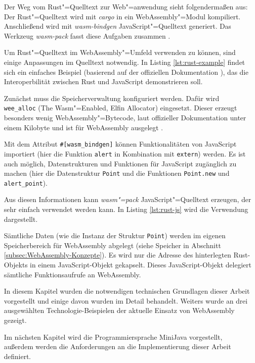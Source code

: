 Der Weg vom Rust"=Quelltext zur Web"=anwendung sieht folgendermaßen aus: Der Rust"=Quelltext wird mit \emph{cargo} in ein WebAssembly"=Modul kompiliert. Anschließend wird mit \emph{wasm-bindgen} JavaScript"=Quelltext generiert. Das Werkzeug \emph{wasm-pack} fasst diese Aufgaben zusammen \cite{RustWasmBook}.

Um Rust"=Quelltext im WebAssembly"=Umfeld verwenden zu können, sind einige Anpassungen im Quelltext notwendig. In Listing \ref{lst:rust-example} findet sich ein einfaches Beispiel (basierend auf der offiziellen Dokumentation \cite{RustWasmBook}), das die Interoperbilität zwischen Rust und JavaScript demonstrieren soll.



Zunächst muss die Speicherverwaltung konfiguriert werden. Dafür wird \lstinline{wee_alloc} (The Wasm"=Enabled, Elfin Allocator) eingesetzt. Dieser erzeugt besonders wenig WebAssembly"=Bytecode, laut offizieller Dokumentation unter einem Kilobyte und ist für WebAssembly ausgelegt \cite{WeeAlloc}.

Mit dem Attribut \lstinline{#[wasm_bindgen]} können Funktionalitäten von JavaScript importiert (hier die Funktion \lstinline{alert} in Kombination mit \lstinline{extern}) werden. Es ist auch möglich, Datenstrukturen und Funktionen für JavaScript zugänglich zu machen (hier die Datenstruktur \lstinline{Point} und die Funktionen \lstinline{Point.new} und \lstinline{alert_point}).

Aus diesen Informationen kann \emph{wasm"=pack} JavaScript"=Quelltext erzeugen, der sehr einfach verwendet werden kann. In Listing \ref{lst:rust-js} wird die Verwendung dargestellt. 



Sämtliche Daten (wie die Instanz der Struktur \lstinline{Point}) werden im eigenen Speicherbereich für WebAssembly abgelegt (siehe Speicher in Abschnitt \ref{subsec:WebAssembly-Konzepte}). Es wird nur die Adresse des hinterlegten Rust-Objekts in einem JavaScript-Objekt gekapselt. Dieses JavaScript-Objekt delegiert sämtliche Funktionsaufrufe an WebAssembly.

\vspace{4em}
In diesem Kapitel wurden die notwendigen technischen Grundlagen dieser Arbeit vorgestellt und einige davon wurden im Detail behandelt. Weiters wurde an drei ausgewählten Technologie-Beispielen der aktuelle Einsatz von WebAssembly gezeigt.

Im nächsten Kapitel wird die Programmiersprache MiniJava vorgestellt, außerdem werden die Anforderungen an die Implementierung dieser Arbeit definiert.